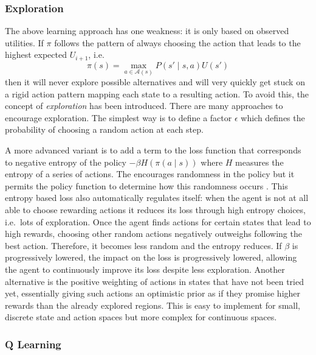 \subsubsection{Exploration}%
\label{sub:exploration}

The above learning approach has one weakness: it is only based on observed utilities. If $\pi$ follows the pattern of
always choosing the action that leads to the highest expected $U_{i+1}$, i.e.\
\begin{equation}
    \pi(s) = \max_{a \in \mathcal{A}(s)}P(s' \mid s, a)U(s')
\end{equation}
then it will never explore possible alternatives and will very quickly get stuck on a rigid action
pattern mapping each state to a resulting action. To avoid this, the concept of \emph{exploration} has been introduced.
There are many approaches to encourage exploration. The simplest way is to define a factor $\epsilon$ which defines the
probability of choosing a random action at each step.

A more advanced variant is to add a term to the loss function that corresponds to negative entropy of the policy $-\beta
H(\pi(a \mid s ))$ where $H$ measures the entropy of a series of actions. The encourages randomness in the policy but
it permits the policy function to determine how this randomness occurs \citep{schmitt2018kickstarting}. This
entropy based loss also automatically regulates itself: when the agent is not at all able to choose rewarding actions
it reduces its loss through high entropy choices, i.e.\ lots of exploration. Once the agent finds actions for certain
states that lead to high rewards, choosing other random actions negatively outweighs following the best action.
Therefore, it becomes less random and the entropy reduces. If $\beta$ is progressively lowered, the impact on the loss
is progressively lowered, allowing the agent to continuously improve its loss despite less exploration.
Another alternative is the positive weighting of actions in states that have not been tried yet, essentially giving such
actions an optimistic prior as if they promise higher rewards than the already explored regions. This is easy to
implement for small, discrete state and action spaces but more complex for continuous spaces.



\subsubsection{Q Learning}%
\label{sub:q_learning}

